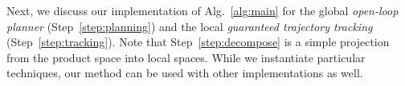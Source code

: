 Next, we discuss our implementation of Alg.~\ref{alg:main} for the global \emph{open-loop planner} (Step~\ref{step:planning}) and the local \emph{guaranteed trajectory tracking} (Step~\ref{step:tracking}). Note that Step~\ref{step:decompose} is a simple projection from the product space into local spaces.
While we instantiate particular techniques, our method can be used with other implementations as well.


